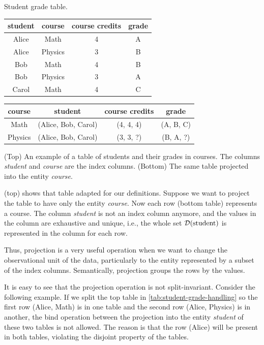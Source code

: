 \begin{tablebox}[label=tab:student-grade-handling]{Student grade table.}
  \centering
  \begin{tabular}{cc|cc}
    \toprule
    \textbf{student} & \textbf{course} & \textbf{course credits} & \textbf{grade} \\
    \midrule
    Alice & Math & 4 & A \\
    Alice & Physics & 3 & B \\
    Bob & Math & 4 & B \\
    Bob & Physics & 3 & A \\
    Carol & Math & 4 & C \\
    \bottomrule
  \end{tabular}

  \vspace{1em}
  \begin{tabular}{c|ccc}
    \toprule
    \textbf{course} & \textbf{student} & \textbf{course credits} & \textbf{grade} \\
    \midrule
    Math & (Alice, Bob, Carol) & (4, 4, 4) & (A, B, C) \\
    Physics & (Alice, Bob, Carol) & (3, 3, ?) & (B, A, ?) \\
    \bottomrule
  \end{tabular}
  \tcblower
  (Top) An example of a table of students and their grades in courses.  The columns
  \emph{student} and \emph{course} are the index columns. (Bottom) The same table
  projected into the entity \emph{course}.
\end{tablebox}

 (top) shows that table adapted for our definitions.
Suppose we want to project the table to have only the entity \emph{course}.
Now each row (bottom table) represents a course.  The column \emph{student} is not an
index column anymore, and the values in the column are exhaustive and unique, i.e.,
the whole set $\mathcal{D}\!\left(\text{student}\right)$ is represented in the column for each row.

Thus, projection is a very useful operation when we want to change the observational unit
of the data, particularly to the entity represented by a subset of the index columns.
Semantically, projection groups the rows by the values.

It is easy to see that the projection operation is not split-invariant.  Consider the
following example. If we split the top table in \cref{tab:student-grade-handling} so the
first row (Alice, Math) is in one table and the second row (Alice, Physics) is in another,
the bind operation between the projection into the entity \emph{student} of these two
tables is not allowed.  The reason is that the row (Alice) will be present in both tables,
violating the disjoint property of the tables.

